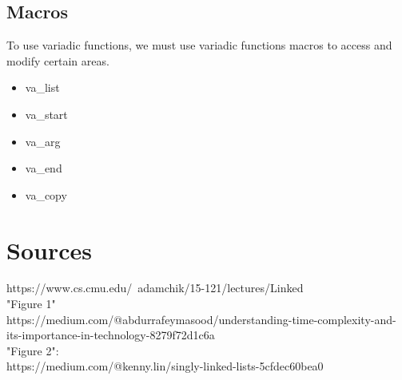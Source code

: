 \documentclass[hidelinks,11pt]{article}
\begin{document}
\subsection{Macros}
To use variadic functions, we must use variadic functions macros to access and modify certain areas.
\begin{itemize}
    \item va\_list
    \item va\_start
    \item va\_arg
    \item va\_end
    \item va\_copy
\end{itemize}

\section{Sources}
https://www.cs.cmu.edu/~adamchik/15-121/lectures/Linked%
\\[0.5\baselineskip]
"Figure 1"\\
https://medium.com/@abdurrafeymasood/understanding-time-complexity-and-its-importance-in-technology-8279f72d1c6a
\\[0.5\baselineskip]
"Figure 2":\\
https://medium.com/@kenny.lin/singly-linked-lists-5cfdec60bea0
\\
\end{document}
